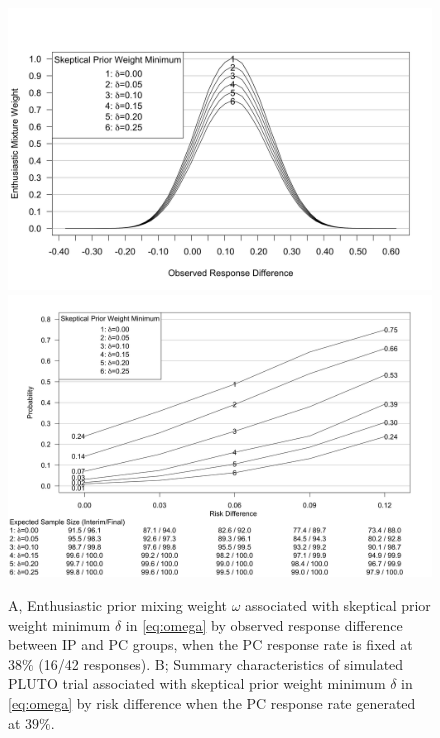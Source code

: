 \documentclass[AMA,STIX1COL,doublespace]{WileyNJD-v2}
\begin{document}
\begin{figure}
\begin{center}
\includegraphics[width=6in]{3-part-compatibility-2.png}
   \includegraphics[width=6in]{figure6.png}
    \caption{A, Enthusiastic prior mixing weight $\omega$ associated with skeptical prior weight minimum $\delta$ in \eqref{eq:omega} by observed response difference between IP and PC groups, when the PC response rate is fixed at $38\%$ (16/42 responses). B; Summary characteristics of simulated PLUTO trial associated with skeptical prior weight minimum $\delta$ in \eqref{eq:omega} by risk difference when the PC response rate generated at $39\%$.}
\label{fig:ex2varyomega}
 \end{center}
\end{figure}
\end{document}
